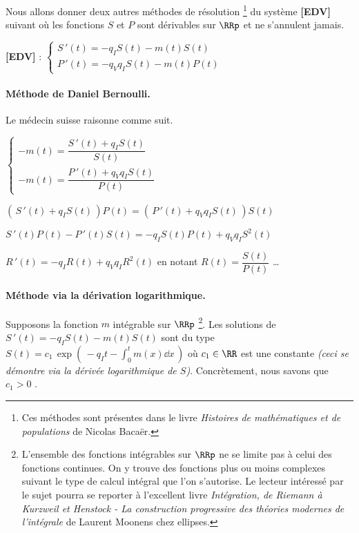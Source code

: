 Nous allons donner deux autres méthodes de résolution
\footnote{
	Ces méthodes sont présentes dans le livre \emph{\og Histoires de mathématiques et de populations \fg} de Nicolas Bacaër. 
}
du système \textbf{[EDV]} suivant où les fonctions $S$ et $P$ sont dérivables sur $\RRp$ et ne s'annulent jamais.

\medskip

\textbf{[EDV]} :
$\begin{cases}
	S\,'(t) = - q_I S(t) - m(t) S(t)     \\
	P\,'(t) = - q_V q_I S(t) - m(t) P(t)
\end{cases}$



\paragraph{Méthode de Daniel Bernoulli.} Le médecin suisse raisonne comme suit.

\bigskip

$\begin{cases}
	- m(t) = \dfrac{S\,'(t) + q_I S(t)}{S(t)}     \\
	- m(t) = \dfrac{P\,'(t) + q_V q_I S(t)}{P(t)}
\end{cases}$

\medskip

$\left( \, S\,'(t) + q_I S(t) \, \right) P(t) = \left( \, P\,'(t) + q_V q_I S(t) \, \right) S(t)$

\bigskip

$S\,'(t) P(t) - P\,'(t) S(t) = - q_I S(t) P(t) + q_V q_I S^2(t)$

\medskip

$R\,'(t) = - q_I R(t) + q_V q_I R^2(t)$ en notant $R(t) = \dfrac{S(t)}{P(t)}$ \dots





\paragraph{Méthode via la dérivation logarithmique.} Supposons la fonction $m$ intégrable sur $\RRp$
\footnote{
	L'ensemble des fonctions intégrables sur $\RRp$ ne se limite pas à celui des fonctions continues. On y trouve des fonctions plus ou moins complexes suivant le type de calcul intégral que l'on s'autorise. Le lecteur intéressé par le sujet pourra se reporter à l'excellent livre \emph{\og Intégration, de Riemann à Kurzweil et Henstock - La construction progressive des théories modernes de l'intégrale \fg} de Laurent Moonens chez ellipses. 
}.
Les solutions de $S\,'(t) = - q_I S(t) - m(t) S(t)$ sont du type $\displaystyle S(t) = c_1 \, \exp \left( \, - q_I t - \int_0^t m(x) \dd{x} \, \right)$ où $c_1 \in \RR$ est une constante \emph{(ceci se démontre via la dérivée logarithmique de $S$)}. Concrètement, nous savons que $c_1 > 0$ .

